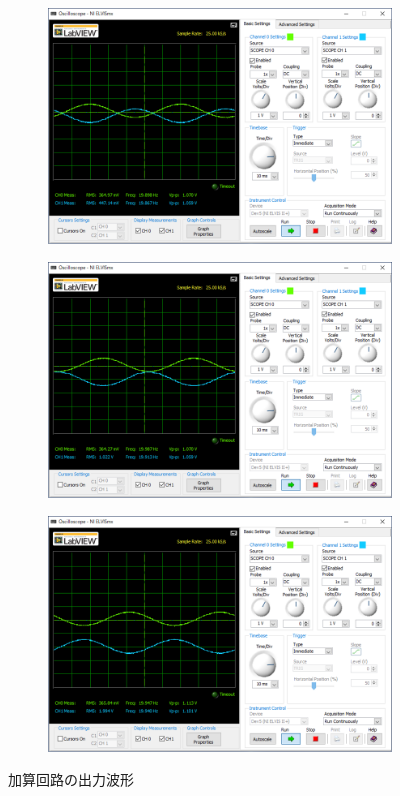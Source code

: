 \begin{figure}
    \centering
    \begin{subfigure}{0.45\textwidth}
        \centering
        \includegraphics[width=0.8\linewidth]{src/figures/exp7/sum-0.png}
        \label{fig:exp7-raw-0}
    \end{subfigure}
    \begin{subfigure}{0.45\textwidth}
        \centering
        \includegraphics[width=0.8\linewidth]{src/figures/exp7/sum-1.png}
        \label{fig:exp7-raw-1}
    \end{subfigure}
    \begin{subfigure}{0.45\textwidth}
        \centering
        \includegraphics[width=0.8\linewidth]{src/figures/exp7/sum-2.png}
        \label{fig:exp7-raw-2}
    \end{subfigure}
    \caption{加算回路の出力波形}\label{fig:exp7-raw}
\end{figure}
